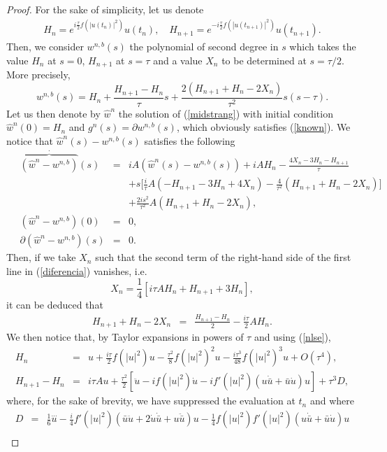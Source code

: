 \documentclass[a4paper,12pt]{article}
\begin{document}
\begin{proof}
For the sake of simplicity, let us denote
\begin{eqnarray}
H_n=e^{i \frac{\tau}{2}f(|u(t_n)|^2)}u(t_n), \quad H_{n+1}=e^{-i \frac{\tau}{2}f(|u(t_{n+1})|^2)}u(t_{n+1}).
\label{HH}
\end{eqnarray}
Then, we consider $w^{n,b}(s)$ the polynomial of second degree in $s$ which takes the value $H_n$ at $s=0$, $H_{n+1}$ at $s=\tau$ and a value $X_n$ to be determined at $s=\tau/2$. More precisely,
$$
w^{n,b}(s)=H_n+\frac{H_{n+1}-H_n}{\tau}s+\frac{2(H_{n+1}+H_n-2 X_n)}{\tau^2}s(s-\tau).$$
Let us then denote by $\hat{w}^n$ the solution of (\ref{midstrang}) with initial condition $\hat{w}^n(0)=H_n$ and $g^n(s)=\partial w^{n,b}(s)$, which obviously satisfies (\ref{known}). We notice that $\hat{w}^n(s)-w^{n,b}(s)$ satisfies the following
\begin{eqnarray}
\quad \stackrel{\cdot}{\overbrace{(\hat{w}^n-w^{n,b})}}(s)&=&i A (\hat{w}^n(s)-w^{n,b}(s))+i A H_n-\frac{4 X_n-3 H_n-H_{n+1}}{\tau} \nonumber \\
\quad &&+s \big[\frac{i}{\tau}A(-H_{n+1}-3 H_n+4 X_n)-\frac{4}{\tau^2}(H_{n+1}+H_n-2 X_n)\big] \nonumber \\
\quad &&+\frac{2 i s^2}{\tau^2}A(H_{n+1}+H_n-2 X_n), \nonumber \\
\quad (\hat{w}^n-w^{n,b})(0)&=&0, \nonumber \\
\quad \partial (\hat{w}^n-w^{n,b})(s)&=&0. \label{diferencia}
\end{eqnarray}
Then, if we take $X_n$ such that the second term of the right-hand side of the first line in (\ref{diferencia}) vanishes, i.e.
$$X_n=\frac{1}{4}[ i \tau A H_n+H_{n+1}+3 H_n],$$
it can be deduced that
\begin{eqnarray}
H_{n+1}+H_n-2 X_n&=&\frac{H_{n+1}-H_n}{2}-\frac{i \tau}{2} A H_n. \nonumber
\end{eqnarray}
We then notice that, by Taylor expansions in powers of $\tau$ and using (\ref{nlse}),
\begin{eqnarray}
H_n&=&u+\frac{i \tau}{2}f(|u|^2)u-\frac{\tau^2}{8}f(|u|^2)^2 u- \frac{i \tau^3}{48} f(|u|^2)^3 u +O(\tau^4), \nonumber \\
H_{n+1}-H_n&=& i \tau A u+\frac{\tau^2}{2}[\ddot{u}-i f(|u|^2) \dot{u}-i f'(|u|^2)(u \dot{\bar{u}}+\bar{u}\dot{u})u]+\tau^3 D, \nonumber
\end{eqnarray}
where, for the sake of brevity, we have suppressed the evaluation at $t_n$ and where
\begin{eqnarray}
D&=&\frac{1}{6}\stackrel{\dots}{u}-\frac{i}{4}f'(|u|^2)(\bar{u}\ddot{u}+2 \dot{u}\dot{\bar{u}}+u \ddot{\bar{u}})u-\frac{1}{4}f(|u|^2)f'(|u|^2)(u\dot{\bar{u}}+\bar{u}\dot{u})u \nonumber \\

\end{eqnarray}
\end{proof}
\end{document}
